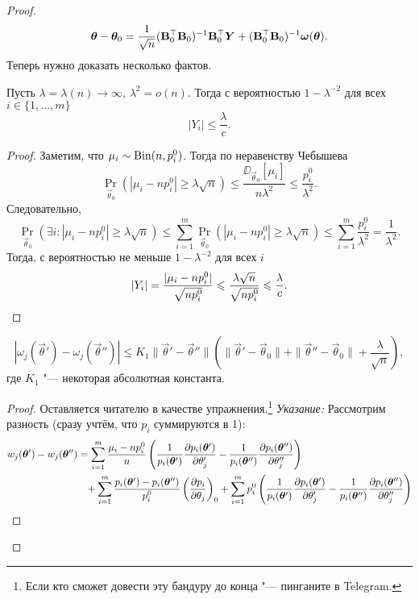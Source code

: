 \begin{proof}
	\[
		\vec{\theta} - \vec{\theta}_{0}
		= \frac{1}{\sqrt{n}}(\matr{B}_{0}^{\top}\matr{B}_{0})^{-1}\matr{B}_{0}^{\top}\vec{Y} + (\matr{B}_{0}^{\top}\matr{B}_{0})^{-1}\vec{\omega}(\vec{\theta}).
	\]
	Теперь нужно доказать несколько фактов.
	\begin{lemma}
		Пусть $\lambda = \lambda(n) \to \infty$, $\lambda^{2} = o(n)$. Тогда с вероятностью $1 - \lambda^{-2}$ для всех $i \in \{1, \ldots, m\}$
		\[
			|Y_{i}| \leq \frac{\lambda}{c}. 
		\]
	\end{lemma}
	\begin{proof}
		Заметим, что $\mu_{i} \sim \Binomial(n, p_{i}^{0})$. Тогда по неравенству Чебышева
		\[
			\Pr_{\vec{\theta}_{0}}\left(\left|\mu_{i} - np_{i}^{0}\right| \geq \lambda\sqrt{n}\right)
			\leq \frac{\DD_{\vec{\theta}_{0}}[\mu_{i}]}{n\lambda^{2}}
			\leq \frac{p_{i}^{0}}{\lambda^{2}}.
		\]
		Следовательно,
		\[
			\Pr_{\vec{\theta}_{0}}\left(\exists i \colon \left|\mu_{i} - np_{i}^{0}\right| \geq \lambda\sqrt{n}\right)
			\leq \sum_{i = 1}^{m} \Pr_{\vec{\theta}_{0}}\left(\left|\mu_{i} - np_{i}^{0}\right| \geq \lambda\sqrt{n}\right)
			\leq \sum_{i = 1}^{m} \frac{p_{i}^{0}}{\lambda^{2}}
			= \frac{1}{\lambda^{2}}.
		\]
		Тогда, с вероятностью не меньше $1 - \lambda^{-2}$ для всех $i$
		\[
			|Y_{i}|
			= \frac{|\mu_{i} - np_{i}^{0}|}{\sqrt{np_{i}^{0}}}
			\leq \frac{\lambda\sqrt{n}}{\sqrt{np_{i}^{0}}}
			\leq \frac{\lambda}{c}. \qedhere
		\]
	\end{proof}
	\begin{lemma}
		\[
			|\omega_{j}(\vec{\theta}') - \omega_{j}(\vec{\theta}'')|
			\leq K_{1}\|\vec{\theta}' - \vec{\theta}''\|\left(\|\vec{\theta}' - \vec{\theta}_{0}\| + \|\vec{\theta}'' - \vec{\theta}_{0}\| + \frac{\lambda}{\sqrt{n}}\right),
		\]
		где $K_{1}$ "--- некоторая абсолютная константа.
	\end{lemma}
	\begin{proof}
		Оставляется читателю в качестве упражнения.\footnote{Если кто сможет довести эту бандуру до конца "--- пинганите в Telegram.} 
		\textit{Указание:} Рассмотрим разность (сразу учтём, что $p_{i}$ суммируются в 1):
		\begin{align*}
			w_{j}(\vec{\theta}') - w_{j}(\vec{\theta}'')
			&= \sum_{i = 1}^{m} \frac{\mu_{i} - np_{i}^{0}}{n}\left(\frac{1}{p_{i}(\vec{\theta}')}\pdv{p_{i}(\vec{\theta}')}{\theta'_{j}} - \frac{1}{p_{i}(\vec{\theta}'')}\pdv{p_{i}(\vec{\theta}'')}{\theta''_{j}}\right) \\
			&\hphantom{=}+ \sum_{i = 1}^{m}\frac{p_{i}(\vec{\theta}') - p_{i}(\vec{\theta}'')}{p_{i}^{0}}\left(\pdv{p_{i}}{\theta_{j}}\right)_{0} + \sum_{i = 1}^{m} p_{i}^{0}\left(\frac{1}{p_{i}(\vec{\theta}')}\pdv{p_{i}(\vec{\theta}')}{\theta'_{j}} - \frac{1}{p_{i}(\vec{\theta}'')}\pdv{p_{i}(\vec{\theta}'')}{\theta''_{j}}\right) \\

\end{align*}
\end{proof}
\end{proof}
